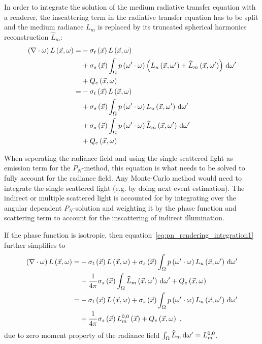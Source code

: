 In order to integrate the solution of the medium radiative transfer equation with a renderer, the inscattering term in the radiative transfer equation has to be split and the medium radiance $L_m$ is replaced by its truncated spherical harmonics reconstruction $\widehat{L}_m$:
\begin{align}
\left(\nabla\cdot\omega\right)L\left(\vec{x}, \omega \right)
=&
-\sigma_t\left(\vec{x}\right) L\left(\vec{x}, \omega \right)\nonumber\\
&
+\sigma_s\left(\vec{x}\right) \int_{\Omega}
{
p\left(\omega'\cdot\omega\right)\left(L_u\left(\vec{x}, \omega' \right)+\widehat{L}_m\left(\vec{x}, \omega' \right)\right)\,\mathrm{d}\omega'
}
\nonumber
\\
&
+Q_e\left(\vec{x}, \omega\right)
\nonumber
\\
=&
-\sigma_t\left(\vec{x}\right) L\left(\vec{x}, \omega \right)
\nonumber\\
&
+\sigma_s\left(\vec{x}\right) \int_{\Omega}
{
p\left(\omega'\cdot\omega\right)L_u\left(\vec{x}, \omega' \right)\,\mathrm{d}\omega'
}
\nonumber\\
&
+\sigma_s\left(\vec{x}\right) \int_{\Omega}
{
p\left(\omega'\cdot\omega\right)\widehat{L}_m\left(\vec{x}, \omega' \right)\,\mathrm{d}\omega'
}
\nonumber\\
&
+Q_e\left(\vec{x}, \omega\right)
\label{eq:pn_rendering_integration1}
\end{align}

When seperating the radiance field and using the single scattered light as emission term for the $P_N$-method, this equation is what needs to be solved to fully account for the radiance field. Any Monte-Carlo method would need to integrate the single scattered light (e.g. by doing next event estimation). The indirect or multiple scattered light is accounted for by integrating over the angular dependent $P_N$-solution and weighting it by the phase function and scattering term to account for the inscattering of indirect illumination.

If the phase function is isotropic, then equation~\ref{eq:pn_rendering_integration1} further simplifies to
\begin{align}
\left(\nabla\cdot\omega\right)L\left(\vec{x}, \omega \right)
=&
-\sigma_t\left(\vec{x}\right) L\left(\vec{x}, \omega \right)
+\sigma_s\left(\vec{x}\right) \int_{\Omega}
{
p\left(\omega'\cdot\omega\right)L_u\left(\vec{x}, \omega' \right)\,\mathrm{d}\omega'
}
\nonumber\\
&
+
\frac{1}{4\pi}
\sigma_s\left(\vec{x}\right)
\int_{\Omega}
{
\widehat{L}_m\left(\vec{x}, \omega' \right)\,\mathrm{d}\omega'
}
+Q_e\left(\vec{x}, \omega\right)
\nonumber\\
=&
-\sigma_t\left(\vec{x}\right) L\left(\vec{x}, \omega \right)
+\sigma_s\left(\vec{x}\right) \int_{\Omega}
{
p\left(\omega'\cdot\omega\right)L_u\left(\vec{x}, \omega' \right)\,\mathrm{d}\omega'
}
\nonumber\\
&
+
\frac{1}{4\pi}
\sigma_s\left(\vec{x}\right)
L_m^{0,0}\left(\vec{x}\right)
+Q_e\left(\vec{x}, \omega\right)
\ ,
\end{align}
due to zero moment property of the radiance field $\int_{\Omega}\widehat{L}_m\,\mathrm{d}\omega'=L_m^{0,0}$.

